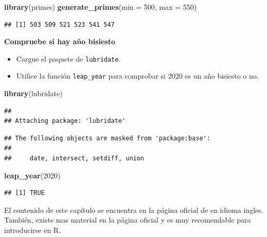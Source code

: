 \documentclass[
]{book}
\newenvironment{Shaded}{\begin{snugshade}}{\end{snugshade}}
\newcommand{\DataTypeTok}[1]{\textcolor[rgb]{0.13,0.29,0.53}{#1}}
\newcommand{\DecValTok}[1]{\textcolor[rgb]{0.00,0.00,0.81}{#1}}
\newcommand{\KeywordTok}[1]{\textcolor[rgb]{0.13,0.29,0.53}{\textbf{#1}}}
\newcommand{\NormalTok}[1]{#1}
\providecommand{\tightlist}{%
  \setlength{\itemsep}{0pt}\setlength{\parskip}{0pt}}
\begin{document}
\begin{Shaded}
\begin{Highlighting}[]
\KeywordTok{library}\NormalTok{(primes)}
\KeywordTok{generate_primes}\NormalTok{(}\DataTypeTok{min =} \DecValTok{500}\NormalTok{, }\DataTypeTok{max =} \DecValTok{550}\NormalTok{)}
\end{Highlighting}
\end{Shaded}

\begin{verbatim}
## [1] 503 509 521 523 541 547
\end{verbatim}

\textbf{Compruebe si hay año bisiesto}

\begin{itemize}
\tightlist
\item
  Cargue el paquete de \texttt{lubridate}.
\item
  Utilice la función \texttt{leap\_year} para comprobar si 2020 es un año bisiesto o no.
\end{itemize}

\begin{Shaded}
\begin{Highlighting}[]
\KeywordTok{library}\NormalTok{(lubridate)}
\end{Highlighting}
\end{Shaded}

\begin{verbatim}
## 
## Attaching package: 'lubridate'
\end{verbatim}

\begin{verbatim}
## The following objects are masked from 'package:base':
## 
##     date, intersect, setdiff, union
\end{verbatim}

\begin{Shaded}
\begin{Highlighting}[]
\KeywordTok{leap_year}\NormalTok{(}\DecValTok{2020}\NormalTok{)}
\end{Highlighting}
\end{Shaded}

\begin{verbatim}
## [1] TRUE
\end{verbatim}

El contenido de este capítulo se encuentra en la página oficial de \citep{quantargo1} en idioma ingles. También, existe mas material en la página oficial y es muy recomendable para introducirse en R.
\end{document}
